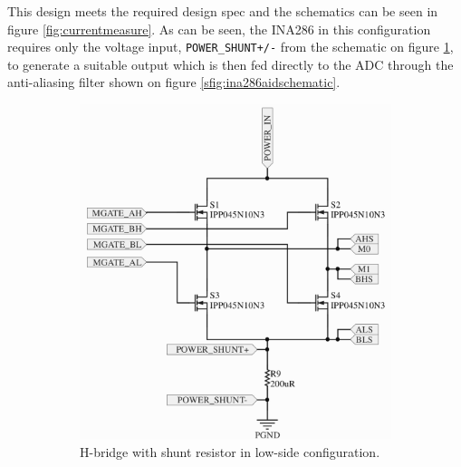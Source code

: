 This design meets the required design spec and the schematics can be seen in figure \ref{fig:currentmeasure}.
As can be seen, the INA286 in this configuration requires only the voltage input, \texttt{POWER\_SHUNT+/-} from the schematic on figure \ref{sfig:hbridgeshunt}, to generate a suitable output which is then fed directly to the ADC through the anti-aliasing filter shown on figure \ref{sfig:ina286aidschematic}.

\begin{figure}
	\centering
	\begin{subfigure}[b]{0.49\textwidth}
		\centering
		\includegraphics[width=\linewidth]{graphics/hbridge}
		\caption{H-bridge with shunt resistor in low-side configuration.}
		\label{sfig:hbridgeshunt}	
	\end{subfigure}
	\begin{subfigure}[b]{0.49\textwidth}
		\centering

\end{subfigure}
\end{figure}
